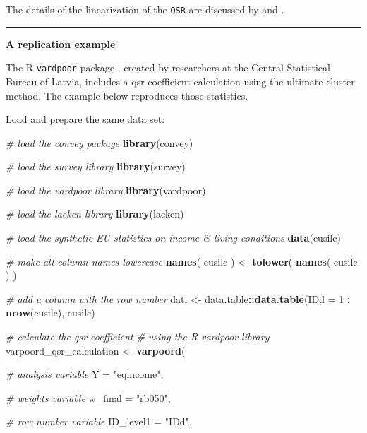 \documentclass[]{book}
\newenvironment{Shaded}{\begin{snugshade}}{\end{snugshade}}
\newcommand{\CommentTok}[1]{\textcolor[rgb]{0.56,0.35,0.01}{\textit{#1}}}
\newcommand{\DataTypeTok}[1]{\textcolor[rgb]{0.13,0.29,0.53}{#1}}
\newcommand{\DecValTok}[1]{\textcolor[rgb]{0.00,0.00,0.81}{#1}}
\newcommand{\KeywordTok}[1]{\textcolor[rgb]{0.13,0.29,0.53}{\textbf{#1}}}
\newcommand{\NormalTok}[1]{#1}
\newcommand{\OperatorTok}[1]{\textcolor[rgb]{0.81,0.36,0.00}{\textbf{#1}}}
\newcommand{\StringTok}[1]{\textcolor[rgb]{0.31,0.60,0.02}{#1}}
\begin{document}
The details of the linearization of the \texttt{QSR} are discussed by \citet{deville1999} and \citet{osier2009}.

\begin{center}\rule{0.5\linewidth}{0.5pt}\end{center}

\textbf{A replication example}

The R \texttt{vardpoor} package \citep{vardpoor}, created by researchers at the Central Statistical Bureau of Latvia, includes a qsr coefficient calculation using the ultimate cluster method. The example below reproduces those statistics.

Load and prepare the same data set:

\begin{Shaded}
\begin{Highlighting}[]
\CommentTok{# load the convey package}
\KeywordTok{library}\NormalTok{(convey)}

\CommentTok{# load the survey library}
\KeywordTok{library}\NormalTok{(survey)}

\CommentTok{# load the vardpoor library}
\KeywordTok{library}\NormalTok{(vardpoor)}

\CommentTok{# load the laeken library}
\KeywordTok{library}\NormalTok{(laeken)}

\CommentTok{# load the synthetic EU statistics on income & living conditions}
\KeywordTok{data}\NormalTok{(eusilc)}

\CommentTok{# make all column names lowercase}
\KeywordTok{names}\NormalTok{( eusilc ) <-}\StringTok{ }\KeywordTok{tolower}\NormalTok{( }\KeywordTok{names}\NormalTok{( eusilc ) )}

\CommentTok{# add a column with the row number}
\NormalTok{dati <-}\StringTok{ }\NormalTok{data.table}\OperatorTok{::}\KeywordTok{data.table}\NormalTok{(}\DataTypeTok{IDd =} \DecValTok{1} \OperatorTok{:}\StringTok{ }\KeywordTok{nrow}\NormalTok{(eusilc), eusilc)}

\CommentTok{# calculate the qsr coefficient}
\CommentTok{# using the R vardpoor library}
\NormalTok{varpoord_qsr_calculation <-}
\StringTok{    }\KeywordTok{varpoord}\NormalTok{(}
    
        \CommentTok{# analysis variable}
        \DataTypeTok{Y =} \StringTok{"eqincome"}\NormalTok{, }
        
        \CommentTok{# weights variable}
        \DataTypeTok{w_final =} \StringTok{"rb050"}\NormalTok{,}
        
        \CommentTok{# row number variable}
        \DataTypeTok{ID_level1 =} \StringTok{"IDd"}\NormalTok{,}
        

\end{Highlighting}
\end{Shaded}
\end{document}
